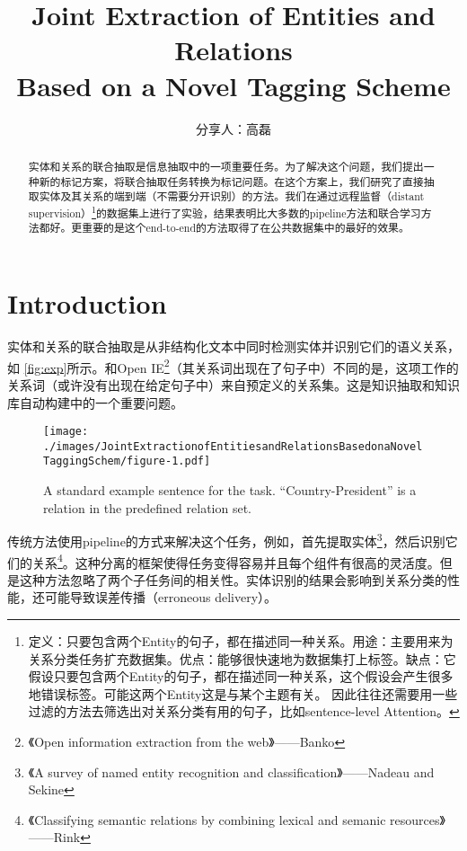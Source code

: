 \documentclass[a4paper,UTF8,no-math]{ctexart}
\title{ Joint Extraction of Entities and Relations \\ Based on a Novel Tagging Scheme }
\author{ 分享人：高磊 }
\date{\zhtoday}
\begin{document}
	\maketitle



	
	\begin{abstract}
		实体和关系的联合抽取是信息抽取中的一项重要任务。为了解决这个问题，我们提出一种新的标记方案，将联合抽取任务转换为标记问题。在这个方案上，我们研究了直接抽取实体及其关系的端到端（不需要分开识别）的方法。我们在通过远程监督（distant supervision）\footnote{定义：只要包含两个Entity的句子，都在描述同一种关系。用途：主要用来为关系分类任务扩充数据集。优点：能够很快速地为数据集打上标签。缺点：它假设只要包含两个Entity的句子，都在描述同一种关系，这个假设会产生很多地错误标签。可能这两个Entity这是与某个主题有关。 因此往往还需要用一些过滤的方法去筛选出对关系分类有用的句子，比如sentence-level Attention。}的数据集上进行了实验，结果表明比大多数的pipeline方法和联合学习方法都好。更重要的是这个end-to-end的方法取得了在公共数据集中的最好的效果。
	\end{abstract}
	\section{Introduction}
	
	实体和关系的联合抽取是从非结构化文本中同时检测实体并识别它们的语义关系，如 \autoref{fig:exp}所示。和Open IE\footnote{《Open information extraction from the web》——Banko}（其关系词出现在了句子中）不同的是，这项工作的关系词（或许没有出现在给定句子中）来自预定义的关系集。这是知识抽取和知识库自动构建中的一个重要问题。
	
	\begin{figure}[h]
		\begin{center}
			\texttt{[image: ./images/JointExtractionofEntitiesandRelationsBasedonaNovelTaggingSchem/figure-1.pdf]}
			\caption{\label{fig:exp}A standard example sentence for the task. ``Country-President'' is a relation in the predefined relation set.}
		\end{center}
	\end{figure}
	
	传统方法使用pipeline的方式来解决这个任务，例如，首先提取实体\footnote{《A survey of named entity recognition and classification》——Nadeau and Sekine}，然后识别它们的关系\footnote{《Classifying semantic relations by combining lexical and semanic resources》——Rink}。这种分离的框架使得任务变得容易并且每个组件有很高的灵活度。但是这种方法忽略了两个子任务间的相关性。实体识别的结果会影响到关系分类的性能，还可能导致误差传播（erroneous delivery）。
	
\end{document}
